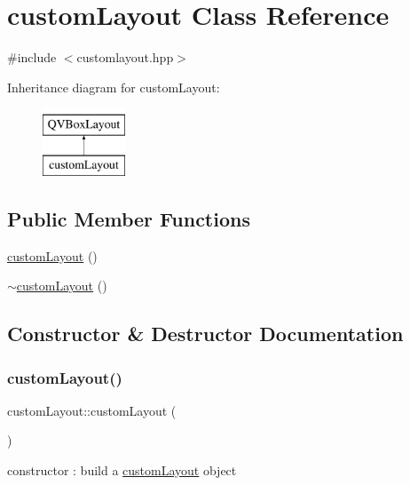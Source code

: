 \hypertarget{classcustomLayout}{}\section{custom\+Layout Class Reference}
\label{classcustomLayout}


{\ttfamily \#include $<$customlayout.\+hpp$>$}

Inheritance diagram for custom\+Layout\+:\begin{figure}[H]
\begin{center}
\leavevmode
\includegraphics[height=2.000000cm]{classcustomLayout}
\end{center}
\end{figure}
\subsection*{Public Member Functions}
\begin{DoxyCompactItemize}
\item 
\hyperlink{classcustomLayout_a14b93725fce968795de5075669c0ba27}{custom\+Layout} ()
\item 
\hyperlink{classcustomLayout_a8cf39533c4adeb767eba788c1965f1ff}{$\sim$custom\+Layout} ()
\end{DoxyCompactItemize}


\subsection{Constructor \& Destructor Documentation}
\mbox{\label{classcustomLayout_a14b93725fce968795de5075669c0ba27}} 
\subsubsection{\texorpdfstring{custom\+Layout()}{customLayout()}}
{\footnotesize\ttfamily custom\+Layout\+::custom\+Layout (\begin{DoxyParamCaption}{ }\end{DoxyParamCaption})}

constructor \+: build a \hyperlink{classcustomLayout}{custom\+Layout} object \mbox{\label{classcustomLayout_a8cf39533c4adeb767eba788c1965f1ff}} 
